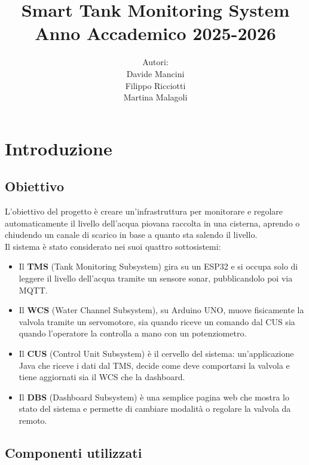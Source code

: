 \documentclass[a4paper,12pt]{report}
\title{
	Smart Tank Monitoring System\\
	\large Anno Accademico 2025-2026
}
\author {
	Autori:\\Davide Mancini\\Filippo Ricciotti\\Martina Malagoli
}
\begin{document}
\maketitle

\newpage

\tableofcontents

\chapter{Introduzione}

\section{Obiettivo}

L'obiettivo del progetto è creare un'infrastruttura per monitorare e regolare automaticamente il livello dell'acqua piovana raccolta in una cisterna, aprendo o chiudendo un canale di scarico in base a quanto sta salendo il livello.\\
Il sistema è stato considerato nei suoi quattro sottosistemi:
\begin{itemize}
     \item Il \textbf{TMS} (Tank Monitoring Subsystem) gira su un ESP32 e si occupa solo di leggere il livello dell'acqua tramite un sensore sonar, pubblicandolo poi via MQTT.
    \item Il \textbf{WCS} (Water Channel Subsystem), su Arduino UNO, muove fisicamente la valvola tramite un servomotore, sia quando riceve un comando dal CUS sia quando l'operatore la controlla a mano con un potenziometro.
    \item Il \textbf{CUS} (Control Unit Subsystem) è il cervello del sistema: un'applicazione Java che riceve i dati dal TMS, decide come deve comportarsi la valvola e tiene aggiornati sia il WCS che la dashboard.
    \item Il \textbf{DBS} (Dashboard Subsystem) è una semplice pagina web che mostra lo stato del sistema e permette di cambiare modalità o regolare la valvola da remoto.
\end{itemize}

\section{Componenti utilizzati}
\end{document}
